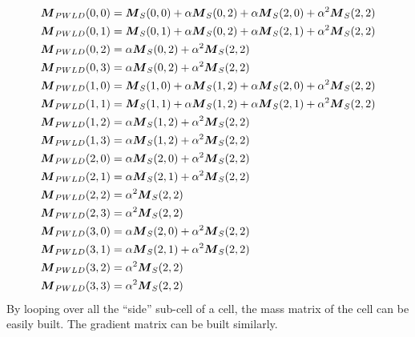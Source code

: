 {\allowdisplaybreaks
\begin{align}
  & \boldsymbol{M}_{PWLD}(0,0) =  \boldsymbol{M}_S(0,0) + \alpha \boldsymbol{M}_S(0,2) + \alpha
  \boldsymbol{M}_S(2,0) + \alpha^2 \boldsymbol{M}_S(2,2)\\
  & \boldsymbol{M}_{PWLD}(0,1) =  \boldsymbol{M}_S(0,1) + \alpha \boldsymbol{M}_S(0,2) + \alpha
  \boldsymbol{M}_S(2,1) + \alpha^2 \boldsymbol{M}_S(2,2)\\
  & \boldsymbol{M}_{PWLD}(0,2) =  \alpha \boldsymbol{M}_S(0,2) + \alpha^2 \boldsymbol{M}_S(2,2)\\
  & \boldsymbol{M}_{PWLD}(0,3) =  \alpha \boldsymbol{M}_S(0,2) + \alpha^2 \boldsymbol{M}_S(2,2)\\
  & \boldsymbol{M}_{PWLD}(1,0) =  \boldsymbol{M}_S(1,0) + \alpha \boldsymbol{M}_S(1,2) + \alpha
  \boldsymbol{M}_S(2,0) + \alpha^2 \boldsymbol{M}_S(2,2)\\
  & \boldsymbol{M}_{PWLD}(1,1) =  \boldsymbol{M}_S(1,1) + \alpha \boldsymbol{M}_S(1,2) + \alpha
  \boldsymbol{M}_S(2,1) + \alpha^2 \boldsymbol{M}_S(2,2)\\
  & \boldsymbol{M}_{PWLD}(1,2) =  \alpha \boldsymbol{M}_S(1,2) + \alpha^2 \boldsymbol{M}_S(2,2)\\
  & \boldsymbol{M}_{PWLD}(1,3) =  \alpha \boldsymbol{M}_S(1,2) + \alpha^2 \boldsymbol{M}_S(2,2)\\
  & \boldsymbol{M}_{PWLD}(2,0) =  \alpha \boldsymbol{M}_S(2,0) + \alpha^2 \boldsymbol{M}_S(2,2)\\
  & \boldsymbol{M}_{PWLD}(2,1) =  \alpha \boldsymbol{M}_S(2,1) + \alpha^2 \boldsymbol{M}_S(2,2)\\
  & \boldsymbol{M}_{PWLD}(2,2) =  \alpha^2 \boldsymbol{M}_S(2,2)\\
  & \boldsymbol{M}_{PWLD}(2,3) =  \alpha^2 \boldsymbol{M}_S(2,2)\\
  & \boldsymbol{M}_{PWLD}(3,0) =  \alpha \boldsymbol{M}_S(2,0) + \alpha^2 \boldsymbol{M}_S(2,2)\\
  & \boldsymbol{M}_{PWLD}(3,1) =  \alpha \boldsymbol{M}_S(2,1) + \alpha^2 \boldsymbol{M}_S(2,2)\\
  & \boldsymbol{M}_{PWLD}(3,2) =  \alpha^2 \boldsymbol{M}_S(2,2)\\
  & \boldsymbol{M}_{PWLD}(3,3) =  \alpha^2 \boldsymbol{M}_S(2,2)
\end{align}}    
By looping over all the ``side'' sub-cell of a cell, the mass matrix of the 
cell can be easily built. The gradient matrix can be built similarly.

